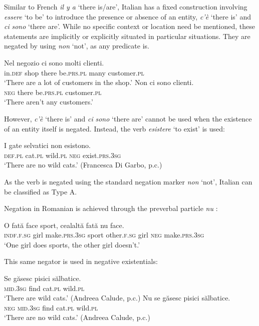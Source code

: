 \documentclass[output=paper,colorlinks,citecolor=brown]{langscibook}
\begin{document}
\begin{paperappendix}
\begin{unindented}
Similar to French \textit{il y a} `there is/are', Italian has a fixed construction involving \textit{essere} `to be' to introduce the presence or absence of an entity, \textit{c’è} `there is' and \textit{ci} \textit{sono} `there are'. While no specific context or location need be mentioned, these statements are implicitly or explicitly situated in particular situations. They are negated by using \textit{non} `not', as any predicate is. 
%
\begin{exe}\ex \gll
Nel negozio ci sono molti clienti.  \\
in.\textsc{def} shop there be.\textsc{prs.pl} many customer.\textsc{pl} \\
    \glt `There are a lot of customers in the shop.'  \citep[32]{PeyronelHiggins2006}
\ex \gll Non ci sono clienti.  \\
\textsc{neg} there be.\textsc{prs.pl} customer.\textsc{pl} \\
    \glt `There aren't any customers.' \citep[33]{PeyronelHiggins2006}
    \end{exe}

However, \textit{c’è} `there is' and \textit{ci} \textit{sono} `there are' cannot be used when the existence of an entity itself is negated. Instead, the verb \textit{esistere} `to exist' is used:
%
\begin{exe}\ex \gll I gate selvatici non esistono. \\
\textsc{def.pl} cat.\textsc{pl} wild.\textsc{pl} \textsc{neg} exist.\textsc{prs.3sg} \\
    \glt `There are no wild cats.' (Francesca Di Garbo, p.c.)
    \end{exe} 

As the verb is negated using the standard negation marker \textit{non} `not', Italian can be classified as Type A.  


Negation in Romanian is achieved through the preverbal particle \textit{nu}
\parencite[see][]{Gonczol2008}:
%
\begin{exe}\ex \gll O fată face sport, cealaltă fată nu face.  \\
\textsc{indf.f.sg} girl make.\textsc{prs.3sg} sport other.\textsc{f.sg} girl \textsc{neg} make.\textsc{prs.3sg} \\
    \glt `One girl does sports, the other girl doesn't.' \parencite[36]{Gonczol2008}
    \end{exe}

This same negator is used in negative existentials:
%
\begin{exe}\ex \gll Se găsesc pisici sălbatice.   \\
\textsc{mid.3sg} find cat.\textsc{pl} wild.\textsc{pl} \\
    \glt `There are wild cats.' (Andreea Calude, p.c.)
\ex \gll Nu se găsesc pisici sălbatice. \\
\textsc{neg} \textsc{mid.3sg} find cat.\textsc{pl} wild.\textsc{pl} \\
    \glt `There are no wild cats.' (Andreea Calude, p.c.)
    \end{exe}


\end{unindented}
\end{paperappendix}
\end{document}

